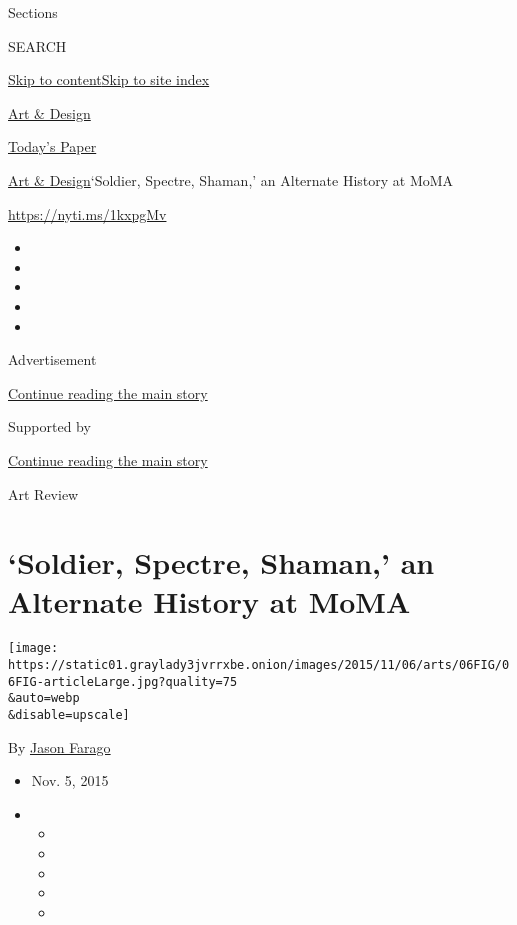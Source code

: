 Sections

SEARCH

\protect\hyperlink{site-content}{Skip to
content}\protect\hyperlink{site-index}{Skip to site index}

\href{https://www.nytimes3xbfgragh.onion/section/arts/design}{Art \&
Design}

\href{https://myaccount.nytimes3xbfgragh.onion/auth/login?response_type=cookie\&client_id=vi}{}

\href{https://www.nytimes3xbfgragh.onion/section/todayspaper}{Today's
Paper}

\href{/section/arts/design}{Art \& Design}\textbar{}`Soldier, Spectre,
Shaman,' an Alternate History at MoMA

\url{https://nyti.ms/1kxpgMv}

\begin{itemize}
\item
\item
\item
\item
\item
\end{itemize}

Advertisement

\protect\hyperlink{after-top}{Continue reading the main story}

Supported by

\protect\hyperlink{after-sponsor}{Continue reading the main story}

Art Review

\hypertarget{soldier-spectre-shaman-an-alternate-history-at-moma}{%
\section{`Soldier, Spectre, Shaman,' an Alternate History at
MoMA}\label{soldier-spectre-shaman-an-alternate-history-at-moma}}

\texttt{[image: https://static01.graylady3jvrrxbe.onion/images/2015/11/06/arts/06FIG/06FIG-articleLarge.jpg?quality=75\\\&auto=webp\\\&disable=upscale]}

By \href{https://www.nytimes3xbfgragh.onion/by/jason-farago}{Jason
Farago}

\begin{itemize}
\item
  Nov. 5, 2015
\item
  \begin{itemize}
  \item
  \item
  \item
  \item
  \item
  \end{itemize}
\end{itemize}

